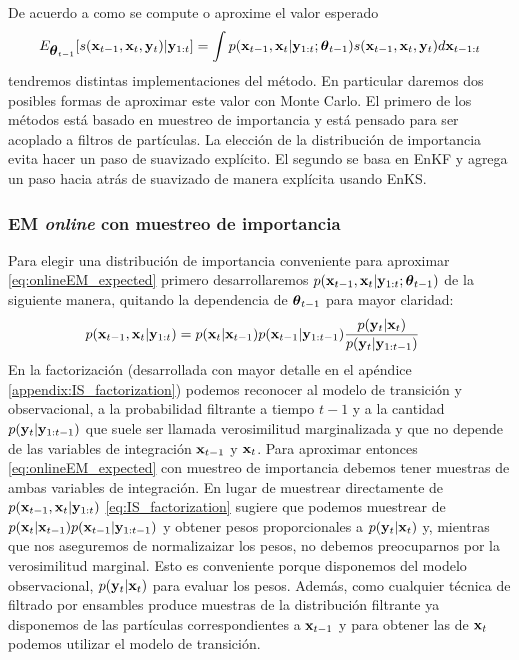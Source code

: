 De acuerdo a como se compute o aproxime el valor esperado
\begin{align}
    E_{\mbox{\boldmath$ \theta $}_{t-1}} [s(\mathbf{x}_{t-1}, \mathbf{x}_t, \mathbf{y}_t) | \mathbf{y}_{1:t}] = \int p(\mathbf{x}_{t-1}, \mathbf{x}_t| \mathbf{y}_{1:t} ; \mbox{\boldmath$ \theta $}_{t-1}) s(\mathbf{x}_{t-1}, \mathbf{x}_t, \mathbf{y}_t) d\mathbf{x}_{t-1:t} \label{eq:onlineEM_expected}
\end{align}
tendremos distintas implementaciones del método. En particular daremos dos posibles formas de aproximar este valor con Monte Carlo. El primero de los métodos está basado en muestreo de importancia y está pensado para ser acoplado a filtros de partículas. La elección de la distribución de importancia evita hacer un paso de suavizado explícito. El segundo se basa en EnKF y agrega un paso hacia atrás de suavizado de manera explícita usando EnKS. 

\subsubsection*{EM \textit{online} con muestreo de importancia} \label{sec:onlineEM_IS}

Para elegir una distribución de importancia conveniente para aproximar \ref{eq:onlineEM_expected} primero desarrollaremos $p(\mathbf{x}_{t-1}, \mathbf{x}_t| \mathbf{y}_{1:t}; \mbox{\boldmath$ \theta $}_{t-1})$ de la siguiente manera, quitando la dependencia de $\mbox{\boldmath$ \theta $}_{t-1}$ para mayor claridad:
\begin{align}
    p(\mathbf{x}_{t-1}, \mathbf{x}_t| \mathbf{y}_{1:t}) &= p(\mathbf{x}_t | \mathbf{x}_{t-1}) p(\mathbf{x}_{t-1} | \mathbf{y}_{1:t-1}) \frac{p(\mathbf{y}_t | \mathbf{x}_t)}{p(\mathbf{y}_t | \mathbf{y}_{1:t-1})} \label{eq:IS_factorization}
\end{align}
En la factorización (desarrollada con mayor detalle en el apéndice \ref{appendix:IS_factorization}) podemos reconocer al modelo de transición y observacional, a la probabilidad filtrante a tiempo $t-1$ y a la cantidad $p(\mathbf{y}_t | \mathbf{y}_{1:t-1})$ que suele ser llamada verosimilitud marginalizada y que no depende de las variables de integración $\mathbf{x}_{t-1}$ y $\mathbf{x}_t$. Para aproximar entonces \ref{eq:onlineEM_expected} con muestreo de importancia debemos tener muestras de ambas variables de integración. En lugar de muestrear directamente de $p(\mathbf{x}_{t-1}, \mathbf{x}_t| \mathbf{y}_{1:t})$ \ref{eq:IS_factorization} sugiere que podemos muestrear de $p(\mathbf{x}_t | \mathbf{x}_{t-1}) p(\mathbf{x}_{t-1} | \mathbf{y}_{1:t-1})$ y obtener pesos proporcionales a $p(\mathbf{y}_t | \mathbf{x}_t)$ y, mientras que nos aseguremos de normalizaizar los pesos, no debemos preocuparnos por la verosimilitud marginal. Esto es conveniente porque disponemos del modelo observacional, $p(\mathbf{y}_t | \mathbf{x}_t)$ para evaluar los pesos. Además, como cualquier técnica de filtrado por ensambles produce muestras de la distribución filtrante ya disponemos de las partículas correspondientes a $\mathbf{x}_{t-1}$ y para obtener las de $\mathbf{x}_t$ podemos utilizar el modelo de transición.

